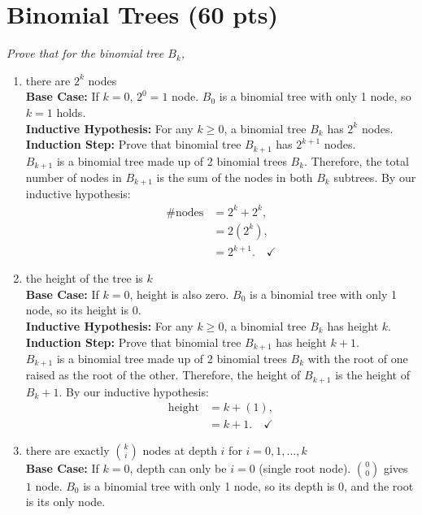 \documentclass[11pt]{article}
\begin{document}
\section{Binomial Trees (60 pts)}

\textit{Prove that for the binomial tree $B_k$,}
\begin{enumerate}
    \item there are $2^k$ nodes\\
    \textbf{Base Case:} If $k=0$, $2^0=1$ node. $B_0$ is a binomial tree with only 1 node, so $k=1$ holds. \\
    \textbf{Inductive Hypothesis:} For any $k \geq 0$, a binomial tree $B_k$ has $2^k$ nodes.\\
    \textbf{Induction Step:} Prove that binomial tree $B_{k+1}$ has $2^{k+1}$ nodes.\\
    $B_{k+1}$ is a binomial tree made up of 2 binomial trees $B_k$. Therefore, the total number of nodes in $B_{k+1}$ is the sum of the nodes in both $B_k$ subtrees. By our inductive hypothesis:
    \begin{align*}
        \text{\# nodes} & = 2^k + 2^k,\\
        & = 2(2^k),\\
        & = 2^{k+1}. \quad \checkmark
    \end{align*}
    \item the height of the tree is $k$\\
    \textbf{Base Case:} If $k=0$, height is also zero. $B_0$ is a binomial tree with only 1 node, so its height is 0. \\
    \textbf{Inductive Hypothesis:} For any $k \geq 0$, a binomial tree $B_k$ has height $k$.\\
    \textbf{Induction Step:} Prove that binomial tree $B_{k+1}$ has height $k+1$.\\
    $B_{k+1}$ is a binomial tree made up of 2 binomial trees $B_k$ with the root of one raised as the root of the other. Therefore, the height of $B_{k+1}$ is the height of $B_k + 1$. By our inductive hypothesis:
    \begin{align*}
        \text{height} & = k + (1),\\
        & = k + 1. \quad \checkmark
    \end{align*}
    \item there are exactly ${k \choose i}$ nodes at depth $i$ for $i = 0, 1, . . . , k$\\
    \textbf{Base Case:} If $k=0$, depth can only be $i=0$ (single root node). ${0 \choose 0}$ gives $1$ node. $B_0$ is a binomial tree with only 1 node, so its depth is 0, and the root is its only node. \\

\end{enumerate}
\end{document}
